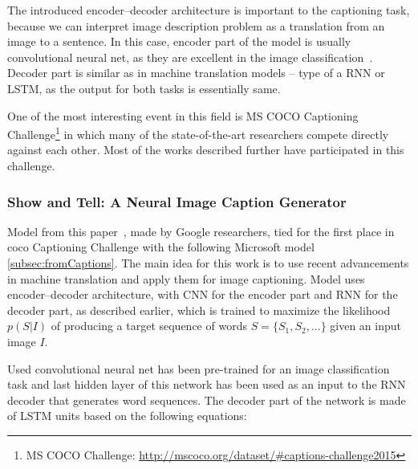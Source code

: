 The introduced encoder--decoder architecture is important to the captioning task, because we can interpret image description problem as a translation from an image to a sentence. In this case, encoder part of the model is usually convolutional neural net, as they are excellent in the image classification~\cite{DBLP:journals/corr/SzegedyLJSRAEVR14}. Decoder part is similar as in machine translation models -- type of a RNN or LSTM, as the output for both tasks is essentially same.

One of the most interesting event in this field is MS COCO Captioning Challenge\footnote{MS COCO Challenge: \url{http://mscoco.org/dataset/\#captions-challenge2015}} in which many of the state-of-the-art researchers compete directly against each other. Most of the works described further have participated in this challenge.


		\subsubsection{Show and Tell: A Neural Image Caption Generator} \label{subsubsec:showtell}

Model from this paper~\cite{DBLP:journals/corr/VinyalsTBE14}, made by Google researchers, tied for the first place in \gls{coco} Captioning Challenge with the following Microsoft model \ref{subsec:fromCaptions}. The main idea for this work is to use recent advancements in machine translation and apply them for image captioning. Model uses encoder--decoder architecture, with CNN for the encoder part and RNN for the decoder part, as described earlier, which is trained to maximize the likelihood $ p(S|I) $ of producing a target sequence of words $ S = \{S_1,S_2,...\} $ given an input image $ I $.

Used convolutional neural net has been pre-trained for an image classification task and last hidden layer of this network has been used as an input to the RNN decoder that generates word sequences. The decoder part of the network is made of LSTM units based on the following equations:

